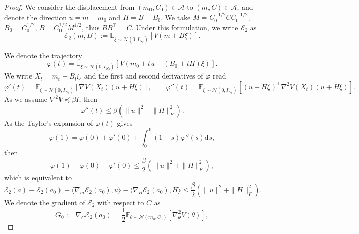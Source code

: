 \documentclass[11pt]{article}
\theoremstyle{plain}
\theoremstyle{definition}
\theoremstyle{remark}
\newcommand{\dd}{\mathrm{d}}
\begin{document}
\begin{proof}
    We consider the displacement from $(m_0, C_0) \in \mathcal{A}$ to $(m, C) \in \mathcal{A}$, and denote the direction $u = m - m_0$ and $H = B - B_0$. We take $M = C_0^{-1/2} C C_0^{-1/2}$, $B_0 = C_0^{1/2}$, $B = C_0^{1/2} M^{1/2}$, thus $BB^\top = C$.
    Under this formulation, we write $\mathcal{E}_2$ as
    \begin{equation*}
        \mathcal{E}_2 (m, B) := \mathbb{E}_{\xi \sim \mathcal{N}(0, I_{N_\theta})} [V(m + B\xi)].
    \end{equation*}

    We denote the trajectory
    \begin{equation*}
        \varphi (t) = \mathbb{E}_{\xi \sim \mathcal{N} (0, I_{N_\theta})} [V(m_0 + tu + (B_0 + tH)\xi)].
    \end{equation*}
    We write $X_t = m_t + B_t \xi$, and the first and second derivatives of $\varphi$ read
    \begin{equation*}
        \varphi'(t) = \mathbb{E}_{\xi \sim \mathcal{N} (0, I_{N_\theta})} [\nabla V(X_t) (u + H\xi)], \qquad \varphi''(t) = \mathbb{E}_{\xi \sim \mathcal{N} (0, I_{N_\theta})} [(u + H\xi)^\top \nabla^2 V(X_t) (u + H\xi)].
    \end{equation*}
    As we assume $\nabla^2 V \preceq \beta  I$, then
    \begin{equation*}
        \varphi''(t) \leq \beta  (\| u \|^2 + \| H \|_F^2).
    \end{equation*}
    As the Taylor's expansion of $\varphi(t)$ gives
    \begin{equation*}
        \varphi(1) = \varphi(0) + \varphi'(0) + \int_0^1 (1 - s) \varphi''(s) \dd s,
    \end{equation*}
    then 
    \begin{equation*}
        \varphi(1) - \varphi(0) - \varphi'(0) \leq \frac{\beta }{2} (\| u \|^2 + \| H \|_F^2),
    \end{equation*}
    which is equivalent to 
    \begin{equation*}
        \mathcal{E}_2 (a) - \mathcal{E}_2 (a_0) - \langle \nabla_m \mathcal{E}_2(a_0), u \rangle - \langle \nabla_B \mathcal{E}_2 (a_0), H \rangle \leq \frac{\beta }{2} (\| u \|^2 + \| H \|_F^2).
    \end{equation*}
    We denote the gradient of $\mathcal{E}_2$ with respect to $C$ as 
    \begin{equation*}
        G_0 := \nabla_C \mathcal{E}_2 (a_0) = \frac{1}{2} \mathbb{E}_{\theta \sim \mathcal{N}(m_0, C_0)} [\nabla^2_\theta V(\theta)],

\end{equation*}
\end{proof}
\end{document}

